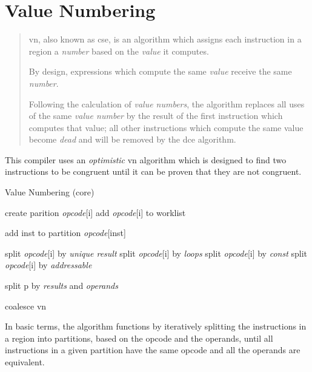 \newcommand{\vnopclass}[1] {\emph{opcode}[#1]\xspace}
\chapter{Value Numbering}
\begin{quote}
  \ac{vn}, also known as \ac{cse}, is an algorithm which assigns each
  instruction in a region a \emph{number} based on the \emph{value} it
  computes.

  By design, expressions which compute the same \emph{value} receive
  the same \emph{number}.

  Following the calculation of \emph{value numbers}, the algorithm
  replaces all uses of the same \emph{value number} by the result of
  the first instruction which computes that value; all other
  instructions which compute the same value become \emph{dead} and
  will be removed by the \ac{dce} algorithm.
\end{quote}

This compiler uses an \emph{optimistic} \ac{vn} algorithm which is
designed to find two instructions to be congruent until it can be
proven that they are not congruent.

\begin{algorithm}[h!]
  \caption{Value Numbering (core)}
  \begin{algorithmic}[1]

      \STATE create parition \vnopclass{i}
      \STATE add \vnopclass{i} to worklist
    \ENDFOR

      \STATE add inst to partition \vnopclass{inst}
      \ENDFOR
    \ENDFOR

      \STATE split \vnopclass{i} by \emph{unique result}
      \STATE split \vnopclass{i} by \emph{loops}
      \STATE split \vnopclass{i} by \emph{const}
      \STATE split \vnopclass{i} by \emph{addressable}
    \ENDFOR

    \STATE split p by \emph{results} and \emph{operands}
    \ENDFOR

    \STATE coalesce \ac{vn}
  \end{algorithmic}
\end{algorithm}

In basic terms, the algorithm functions by iteratively splitting the
instructions in a region into partitions, based on the opcode and the
operands, until all instructions in a given partition have the same
opcode and all the operands are equivalent.

